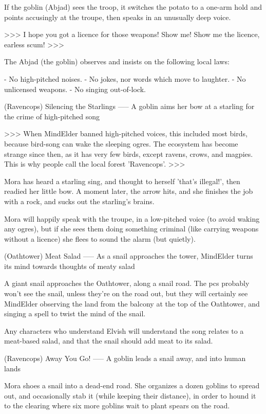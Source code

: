 If the goblin (Abjad) sees the troop, it switches the potato to a one-arm hold and points accusingly at the troupe, then speaks in an unusually deep voice.

>>>
I hope you got a licence for those weapons!
Show me!
Show me the licence, earless scum!
>>>

The Abjad (the goblin) observes and insists on the following local laws:

- No high-pitched noises.
- No jokes, nor words which move to laughter.
- No unlicensed weapons.
- No singing out-of-lock.


(Ravencops) Silencing the Starlings
-----
{A goblin aims her bow at a starling for the crime of high-pitched song}

>>>
When MindElder banned high-pitched voices, this included most birds, because bird-song can wake the sleeping ogres.
The ecosystem has become strange since then, as it has very few birds, except ravens, crows, and magpies.
This is why people call the local forest 'Ravencops'.
>>>

Mora has heard a starling sing, and thought to herself 'that's illegal!', then readied her little bow.
A moment later, the arrow hits, and she finishes the job with a rock, and sucks out the starling's brains.

Mora will happily speak with the troupe, in a low-pitched voice (to avoid waking any ogres), but if she sees them doing something criminal (like carrying weapons without a licence) she flees to sound the alarm (but quietly).

(Oathtower) Meat Salad
-----
{As a snail approaches the tower, MindElder turns its mind towards thoughts of meaty salad}

A giant snail approaches the Oathtower, along a snail road.
The \glspl{pc} probably won't see the snail, unless they're on the road out, but they will certainly see MindElder observing the land from the balcony at the top of the Oathtower, and singing a spell to twist the mind of the snail.

Any characters who understand Elvish
will understand the song relates to a meat-based salad, and that the snail should add meat to its salad.

(Ravencops) Away You Go!
-----
{A goblin leads a snail away, and into human lands}

Mora shoes a snail into a dead-end road.
She organizes a dozen goblins to spread out, and occasionally stab it (while keeping their distance), in order to hound it to the clearing where  six more goblins wait to plant spears on the road.

